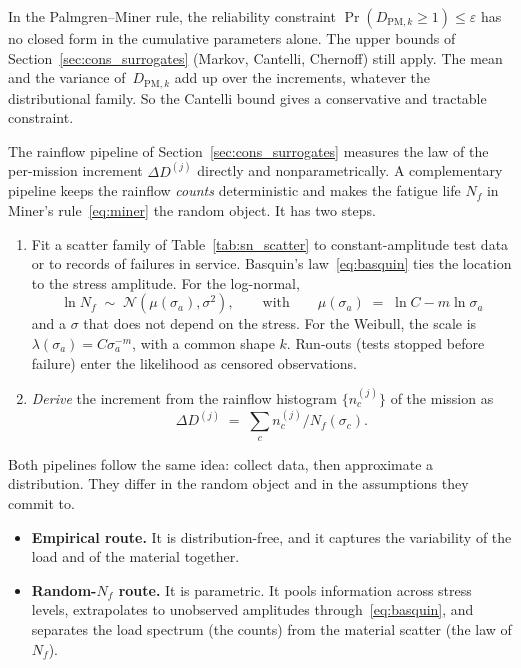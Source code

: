 \documentclass[11pt,a4paper]{article}
\theoremstyle{plain}
\theoremstyle{definition}
\theoremstyle{remark}
\begin{document}
In the Palmgren--Miner rule, the reliability constraint $\Pr(D_{\mathrm{PM},k} \ge 1) \le \varepsilon$ has no closed form in the cumulative parameters alone.
The upper bounds of Section~\ref{sec:cons_surrogates} (Markov, Cantelli, Chernoff) still apply.
The mean and the variance of~$D_{\mathrm{PM},k}$ add up over the increments, whatever the distributional family.
So the Cantelli bound gives a conservative and tractable constraint.

The rainflow pipeline of Section~\ref{sec:cons_surrogates} measures the law of the per-mission increment $\Delta D^{(j)}$ directly and nonparametrically.
A complementary pipeline keeps the rainflow \emph{counts} deterministic and makes the fatigue life $N_f$ in Miner's rule~\eqref{eq:miner} the random object.
It has two steps.
\begin{enumerate}
  \item Fit a scatter family of Table~\ref{tab:sn_scatter} to constant-amplitude test data or to records of failures in service.
    Basquin's law~\eqref{eq:basquin} ties the location to the stress amplitude.
    For the log-normal,
    \begin{equation}
      \ln N_f \;\sim\; \mathcal{N}(\mu(\sigma_a),\sigma^2),
      \qquad\text{with}\qquad
      \mu(\sigma_a) \;=\; \ln C - m \ln \sigma_a
    \end{equation}
    and a $\sigma$ that does not depend on the stress.
    For the Weibull, the scale is $\lambda(\sigma_a) = C\sigma_a^{-m}$, with a common shape $k$.
    Run-outs (tests stopped before failure) enter the likelihood as censored observations.
  \item \emph{Derive} the increment from the rainflow histogram $\{n^{(j)}_c\}$ of the mission as
    \begin{equation}
      \Delta D^{(j)} \;=\; \sum_c n^{(j)}_c / N_f(\sigma_c).
    \end{equation}
\end{enumerate}
Both pipelines follow the same idea: collect data, then approximate a distribution.
They differ in the random object and in the assumptions they commit to.
\begin{itemize}
  \item \textbf{Empirical route.} It is distribution-free, and it captures the variability of the load and of the material together.
  \item \textbf{Random-$N_f$ route.} It is parametric.
    It pools information across stress levels, extrapolates to unobserved amplitudes through~\eqref{eq:basquin}, and separates the load spectrum (the counts) from the material scatter (the law of $N_f$).
\end{itemize}
\end{document}
